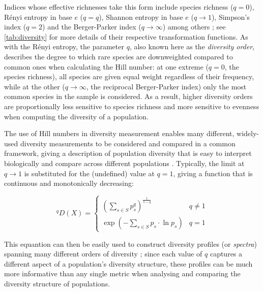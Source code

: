 \noindent Indices whose effective richnesses take this form include species richness ($q=0$), R\'{e}nyi entropy in base $e$ ($q=q$), Shannon entropy in base $e$ ($q \to 1$), Simpson's index ($q = 2$) and the Berger-Parker index ($q \to \infty$) among others \citep{peet1974diversity, hill1973diversity, jost2006entropy, miho2018strategies}; see \autoref{tab:diversity} for more details of their respective transformation functions. As with the R\'{e}nyi entropy, the parameter $q$, also known here as the \textit{diversity order}, describes the degree to which rare species are downweighted compared to common ones when calculating the Hill number: at one extreme ($q=0$, the species richness), all species are given equal weight regardless of their frequency, while at the other ($q \to \infty$, the reciprocal Berger-Parker index) only the most common species in the sample is considered. As a result, higher diversity orders are proportionally less sensitive to species richness and more sensitive to evenness when computing the diversity of a population. %

The use of Hill numbers in diversity measurement enables many different, widely-used diversity measurements to be considered and compared in a common framework, giving a description of population diversity that is easy to interpret biologically and compare across different populations \parencite{jost2006entropy}. Typically, the limit at $q \to 1$ is substituted for the (undefined) value at $q = 1$, giving a function that is continuous and monotonically decreasing:

\begin{equation}
^qD(X) = \begin{cases} \left(\displaystyle\sum_{s \in S} p_s^q \right)^{\frac{1}{1-q}} & q \neq 1\\
\exp\left(-\displaystyle\sum_{s \in S}p_s \cdot \ln p_s\right) & q = 1 \end{cases}
\label{eq:hill_index_continuous}
\end{equation}

\noindent This equantion can then be easily used to construct diversity profiles (or \textit{spectra}) spanning many different orders of diversity \citep{miho2018strategies}; since each value of $q$ captures a different aspect of a population's diversity structure, these profiles can be much more informative than any single metric when analysing and comparing the diversity structure of populations.

